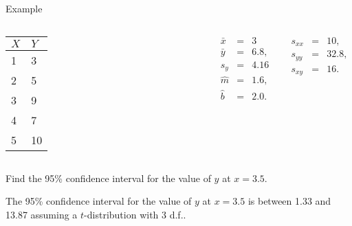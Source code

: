 \begin{frame}{Example}


    \begin{columns}

      \begin{tabular}{l|l}
        $X$ & $Y$ \\ \hline
        1 & 3 \\
        2 & 5  \\
        3 & 9 \\
        4 & 7  \\
        5 & 10
      \end{tabular}


      \begin{eqnarray*}
        \bar{x} & = & 3 \\
        \bar{y} & = & 6.8, \\
        s_y & = & 4.16 \\
        \hat{m} & = & 1.6, \\
        \hat{b} & = & 2.0.
      \end{eqnarray*}


      \begin{eqnarray*}
        s_{xx} & = & 10, \\
        s_{yy} & = & 32.8, \\
        s_{xy} & = & 16.
      \end{eqnarray*}

    \end{columns}


    \vfill 


      Find the 95\% confidence interval for the value of $y$ at $x=3.5$.

      {

        The 95\% confidence interval for the value of $y$ at $x=3.5$
        is between 1.33 and 13.87 assuming a $t$-distribution with 3 d.f..
      }


\end{frame}


